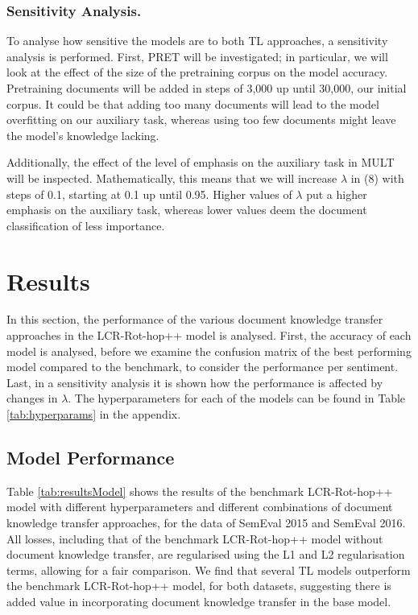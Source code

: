 \documentclass[runningheads]{llncs}
\begin{document}
\subsubsection*{Sensitivity Analysis.}

To analyse how sensitive the models are to both TL approaches, a sensitivity analysis is performed. First, PRET will be investigated; in particular, we will look at the effect of the size of the pretraining corpus on the model accuracy. Pretraining documents will be added in steps of 3,000 up until 30,000, our initial corpus. It could be that adding too many documents will lead to the model overfitting on our auxiliary task, whereas using too few documents might leave the model's knowledge lacking.

Additionally, the effect of the level of emphasis on the auxiliary task in MULT will be inspected. Mathematically, this means that we will increase $\lambda$ in (8) with steps of 0.1, starting at 0.1 up until 0.95. Higher values of $\lambda$ put a higher emphasis on the auxiliary task, whereas lower values deem the document classification of less importance. 

\section{Results}
In this section, the performance of the various document knowledge transfer approaches in the LCR-Rot-hop++ model is analysed. First, the accuracy of each model is analysed, before we examine the confusion matrix of the best performing model compared to the benchmark, to consider the performance per sentiment. Last, in a sensitivity analysis it is shown how the performance is affected by changes in $\lambda$. The  hyperparameters for each of the models can be found in Table \ref{tab:hyperparams} in the appendix.

\subsection{Model Performance}

Table \ref{tab:resultsModel} shows the results of the benchmark LCR-Rot-hop++ model with different hyperparameters and different combinations of document knowledge transfer approaches, for the data of SemEval 2015 and SemEval 2016. All losses, including that of the benchmark LCR-Rot-hop++ model without document knowledge transfer, are regularised using the L1 and L2 regularisation terms, allowing for a fair comparison. We find that several TL models outperform the benchmark LCR-Rot-hop++ model, for both datasets, suggesting there is added value in incorporating document knowledge transfer in the base model.
\end{document}
